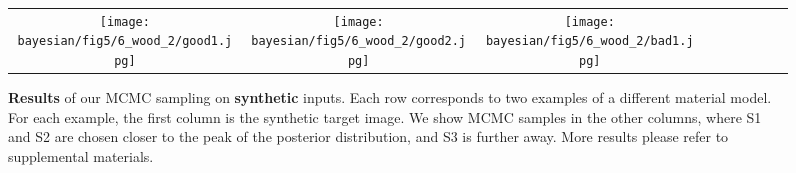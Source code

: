 \begin{figure}[!ht]
\begin{tabular}{ccccccccc}
		\texttt{[image: bayesian/fig5/6\_wood\_2/good1.jpg]} &
		\texttt{[image: bayesian/fig5/6\_wood\_2/good2.jpg]} &
		\texttt{[image: bayesian/fig5/6\_wood\_2/bad1.jpg]}
	\end{tabular}
	\caption[Synthetic results]{\label{fig:bayesian:synthetic}
		\textbf{Results} of our MCMC sampling on \textbf{synthetic} inputs. Each row corresponds to two examples of a different material model. For each example, the first column is the synthetic target image. We show MCMC samples in the other columns, where S1 and S2 are chosen closer to the peak of the posterior distribution, and S3 is further away. More results please refer to supplemental materials.
	}
\end{figure}

